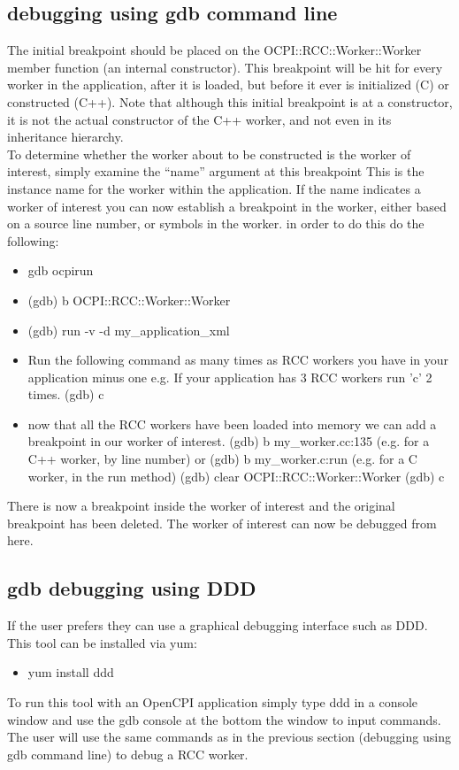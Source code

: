 \subsection{debugging using gdb command line}
\begin{flushleft}
The initial breakpoint should be placed on the OCPI::RCC::Worker::Worker member function (an internal constructor).  This breakpoint will be hit for every worker in the application, after it is loaded, but before it ever is initialized (C) or constructed (C++). Note that although this initial breakpoint is at a constructor, it is not the actual constructor of the C++ worker, and not even in its inheritance hierarchy.\\
\vspace{5mm}
To determine whether the worker about to be constructed is the worker of interest, simply examine the ``name'' argument at this breakpoint  This is the instance name for the worker within the application.  If the name indicates a worker of interest you can now establish a breakpoint in the worker, either based on a source line number, or symbols in the worker.  in order to do this do the following:

\begin{itemize}
   \item gdb ocpirun
   \item (gdb) b OCPI::RCC::Worker::Worker
   \item (gdb) run -v -d my\_application\_xml
   \item Run the following command as many times as RCC workers you have in your application minus one e.g. If your application has 3 RCC workers run 'c' 2 times.
      \subitem (gdb) c
   \item now that all the RCC workers have been loaded into memory we can add a breakpoint in our worker of interest.
   \subitem (gdb) b my\_worker.cc:135 (e.g. for a C++ worker, by line number)
   \subitem  or
   \subitem (gdb) b my\_worker.c:run (e.g. for a C worker, in the run method)
   \subitem (gdb) clear OCPI::RCC::Worker::Worker
   \subitem (gdb) c
\end{itemize}

There is now a breakpoint inside the worker of interest and the original breakpoint has been deleted.  The worker of interest can now be debugged from here.

\subsection{gdb debugging using DDD}
	If the user prefers they can use a graphical debugging interface such as DDD.  This tool can be installed via yum:
	\begin{itemize}
	    \item yum install ddd
	\end{itemize}
To run this tool with an OpenCPI application simply type ddd in a console window and use the gdb console at the bottom the window to input commands.  The user will use the same commands as in the previous section (debugging using gdb command line) to debug a RCC worker.
\end{flushleft}
